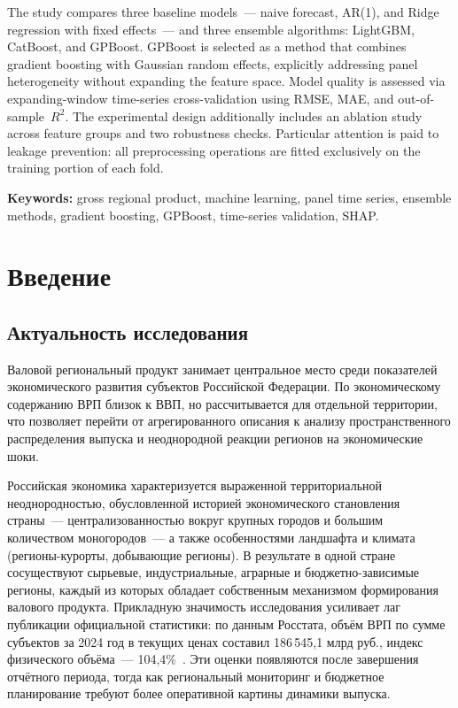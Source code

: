 \documentclass[12pt,a4paper]{article}
\begin{document}
The study compares three baseline models~--- naive forecast, AR(1), and Ridge
regression with fixed effects~--- and three ensemble algorithms: LightGBM,
CatBoost, and GPBoost. GPBoost is selected as a method that combines gradient
boosting with Gaussian random effects, explicitly addressing panel heterogeneity
without expanding the feature space. Model quality is assessed via expanding-window
time-series cross-validation using RMSE, MAE, and out-of-sample~$R^2$. The
experimental design additionally includes an ablation study across feature
groups and two robustness checks. Particular attention is paid to leakage
prevention: all preprocessing operations are fitted exclusively on the training
portion of each fold.

\smallskip\noindent
\textbf{Keywords:} gross regional product, machine learning, panel time series,
ensemble methods, gradient boosting, GPBoost, time-series validation, SHAP.

\newpage
\tableofcontents

\newpage
\section{Введение}

\subsection{Актуальность исследования}

Валовой региональный продукт занимает центральное место среди показателей
экономического развития субъектов Российской Федерации. По экономическому
содержанию ВРП близок к ВВП, но рассчитывается для отдельной территории,
что позволяет перейти от агрегированного описания к анализу пространственного
распределения выпуска и неоднородной реакции регионов на экономические шоки.

Российская экономика характеризуется выраженной территориальной
неоднородностью, обусловленной историей экономического становления
страны~--- централизованностью вокруг крупных городов и большим количеством
моногородов~--- а также особенностями ландшафта и климата (регионы-курорты,
добывающие регионы). В результате в одной стране сосуществуют сырьевые,
индустриальные, аграрные и бюджетно-зависимые регионы, каждый из которых
обладает собственным механизмом формирования валового продукта.
Прикладную значимость исследования усиливает лаг публикации официальной
статистики: по данным Росстата, объём ВРП по сумме субъектов за 2024 год
в текущих ценах составил 186\,545,1 млрд руб., индекс физического
объёма~--- 104,4\%~\cite{rosstat2024}. Эти оценки появляются после завершения
отчётного периода, тогда как региональный мониторинг и бюджетное планирование
требуют более оперативной картины динамики выпуска.
\end{document}
